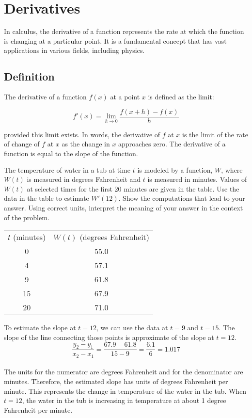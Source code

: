 \chapter{Derivatives}

In calculus, the derivative of a function represents the rate at which
the function is changing at a particular point. It is a fundamental
concept that has vast applications in various fields, including
physics.

\section{Definition}

The derivative of a function $f(x)$ at a point $x$ is defined as the limit:

\begin{equation}
f'(x) = \lim_{{h \to 0}} \frac{f(x+h) - f(x)}{h}
\end{equation}

provided this limit exists. In words, the derivative of $f$ at $x$ is
the limit of the rate of change of $f$ at $x$ as the change in $x$
approaches zero. The derivative of a function is equal to the slope 
of the function. 

\begin{Exercise}
	The temperature of water in a tub at time $t$ is modeled by a 
	function, $W$, where $W(t)$ is measured in degrees Fahrenheit and $t$ 
	is measured in minutes. Values of $W(t)$ at selected times for the 
	first 20 minutes are given in the table. Use the data in the table 
	to estimate $W'(12)$. Show the computations that lead to your answer. 
	Using correct units, interpret the meaning of your answer in the 
	context of the problem. 
	\begin{tabular}{c|c}
	$t$ (minutes) & $W(t)$ (degrees Fahrenheit)\\
	0 & 55.0\\
	4 & 57.1\\
	9 & 61.8\\
	15 & 67.9\\
	20 & 71.0\\
	\end{tabular}	 
\end{Exercise}

\begin{Answer}[ref=slope1]
	To estimate the slope at $t = 12$, we can use the data at $t = 9$ 
	and $t = 15$. The slope of the line connecting those points is 
	approximate of the slope at $t = 12$. 
	$$\frac{y_2 - y_1}{x_2 - x_1} = \frac{67.9 - 61.8}{15 - 9} = 
	\frac{6.1}{6} = 1.017$$ \\
	The units for the numerator are degrees Fahrenheit and for the 
	denominator are minutes. Therefore, the estimated slope has units of 
	degrees Fahrenheit per minute. This represents the change in 
	temperature of the water in the tub. When $t = 12$, the water in the 
	tub is increasing in temperature at about 1 degree Fahrenheit per 
	minute. 
\end{Answer}

